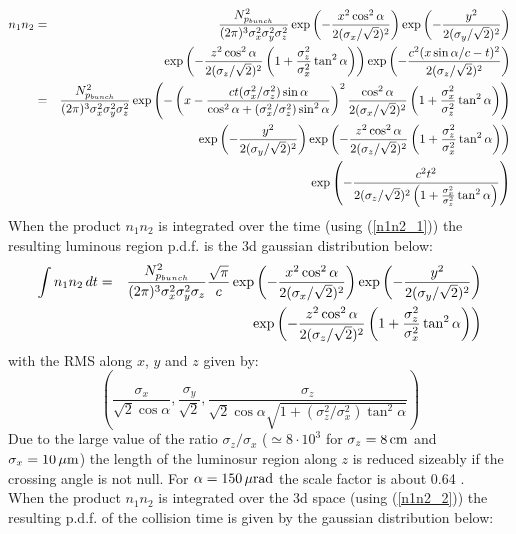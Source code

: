 \documentclass[10pt]{article}
\begin{document}
\begin{eqnarray}
n_1n_2&=&\frac{N^2_{p_{bunch}}}{(2\pi)^3\sigma_x^2\sigma_y^2\sigma_z^2}\exp\left({-\frac{x^2\cos^2\alpha}{2(\sigma_x/\sqrt{2})^2}}\right)
\exp\left({-\frac{y^2}{2(\sigma_y/\sqrt{2})^2}}\right)\cr
&&\exp\left({-\frac{z^2\cos^2\alpha}{2(\sigma_z/\sqrt{2})^2}\left(1+\frac{\sigma^2_z}{\sigma^2_x}\tan^2\alpha\right)}\right)
\exp\left({-\frac{c^2(x\sin\alpha/c-t)^2}{2(\sigma_z/\sqrt{2})^2}}\right)\label{n1n2_1}\\
&=&\frac{N^2_{p_{bunch}}}{(2\pi)^3\sigma_x^2\sigma_y^2\sigma_z^2}\exp\left({-\left(x-\frac{ct(\sigma^2_x/\sigma^2_z)\sin\alpha}{\cos^2\alpha+(\sigma^2_x/\sigma^2_z)\sin^2\alpha}\right)^2\frac{\cos^2\alpha}{2(\sigma_x/\sqrt{2})^2}\left(1+\frac{\sigma^2_x}{\sigma^2_z}\tan^2\alpha\right)}\right)\cr
&&\exp\left({-\frac{y^2}{2(\sigma_y/\sqrt{2})^2}}\right)\exp\left({-\frac{z^2\cos^2\alpha}{2(\sigma_z/\sqrt{2})^2}\left(1+\frac{\sigma^2_z}{\sigma^2_x}\tan^2\alpha\right)}\right)\cr
&&\exp\left({-\frac{c^2t^2}{2(\sigma_z/\sqrt{2})^2\left(1+\frac{\sigma^2_x}{\sigma^2_z}\tan^2\alpha\right)}}\right)\label{n1n2_2}
\end{eqnarray}
When the product $n_1n_2$ is integrated over the time (using (\ref{n1n2_1}))  the resulting luminous region p.d.f. is the 3d gaussian distribution below:
\begin{eqnarray}
\int n_1n_2\,dt&=&\frac{N^2_{p_{bunch}}}{(2\pi)^3\sigma_x^2\sigma_y^2\sigma_z}\frac{\sqrt{\pi}}{c}\exp\left({-\frac{x^2\cos^2\alpha}{2(\sigma_x/\sqrt{2})^2}}\right)
\exp\left({-\frac{y^2}{2(\sigma_y/\sqrt{2})^2}}\right)\cr
&&\exp\left({-\frac{z^2\cos^2\alpha}{2(\sigma_z/\sqrt{2})^2}\left(1+\frac{\sigma^2_z}{\sigma^2_x}\tan^2\alpha\right)}\right)
\end{eqnarray}
with the RMS along $x$, $y$ and $z$ given by:
\begin{equation}
\left(\frac{\sigma_x}{\sqrt{2}\cos\alpha},\frac{\sigma_y}{\sqrt{2}},\frac{\sigma_z}{\sqrt{2}\cos\alpha\sqrt{1+(\sigma^2_z/\sigma^2_x)\tan^2\alpha}}\right)
\end{equation}
Due to the large value of the ratio $\sigma_z/\sigma_x$ ($\simeq 8\cdot 10^3$ for $\sigma_z=8\,{\rm cm}$ and $\sigma_x=10\,{\rm \mu m}$) the length of the luminosur region along $z$ is reduced sizeably if the crossing angle is not null. For $\alpha=150\,{\rm \mu rad}$ the scale factor is about  0.64 .\\
When the product $n_1n_2$ is integrated over the 3d space (using (\ref{n1n2_2})) the resulting p.d.f. of the collision time is given by the gaussian distribution below:
\end{document}
